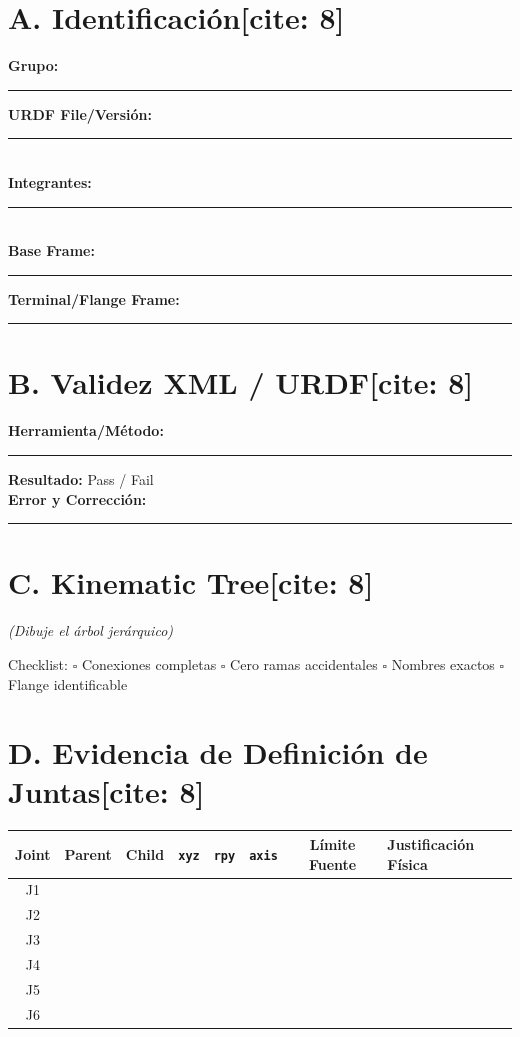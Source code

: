 \documentclass[11pt, a4paper]{article}
\begin{document}
\section*{A. Identificación[cite: 8]}
\textbf{Grupo:} \rule{4cm}{0.15mm} \quad \textbf{URDF File/Versión:} \rule{4cm}{0.15mm} \\
\textbf{Integrantes:} \rule{10cm}{0.15mm} \\
\textbf{Base Frame:} \rule{4cm}{0.15mm} \quad \textbf{Terminal/Flange Frame:} \rule{4cm}{0.15mm}

\section*{B. Validez XML / URDF[cite: 8]}
\textbf{Herramienta/Método:} \rule{4cm}{0.15mm} \quad \textbf{Resultado:} Pass / Fail \\
\textbf{Error y Corrección:} \rule{10cm}{0.15mm}

\section*{C. Kinematic Tree[cite: 8]}
\textit{(Dibuje el árbol jerárquico)}
\vspace{1.5cm}

Checklist: $\square$ Conexiones completas $\square$ Cero ramas accidentales $\square$ Nombres exactos $\square$ Flange identificable

\section*{D. Evidencia de Definición de Juntas[cite: 8]}
\begin{center}
    \footnotesize
    \renewcommand{\arraystretch}{1.5}
    \noindent\begin{tabularx}{\textwidth}{|c|c|c|X|X|c|c|X|}
    \hline
    \textbf{Joint} & \textbf{Parent} & \textbf{Child} & \textbf{\texttt{xyz}} & \textbf{\texttt{rpy}} & \textbf{\texttt{axis}} & \textbf{Límite Fuente} & \textbf{Justificación Física} \\ \hline
    J1 & & & & & & & \\ \hline
    J2 & & & & & & & \\ \hline
    J3 & & & & & & & \\ \hline
    J4 & & & & & & & \\ \hline
    J5 & & & & & & & \\ \hline
    J6 & & & & & & & \\ \hline
    \end{tabularx}
\end{center}
\end{document}
